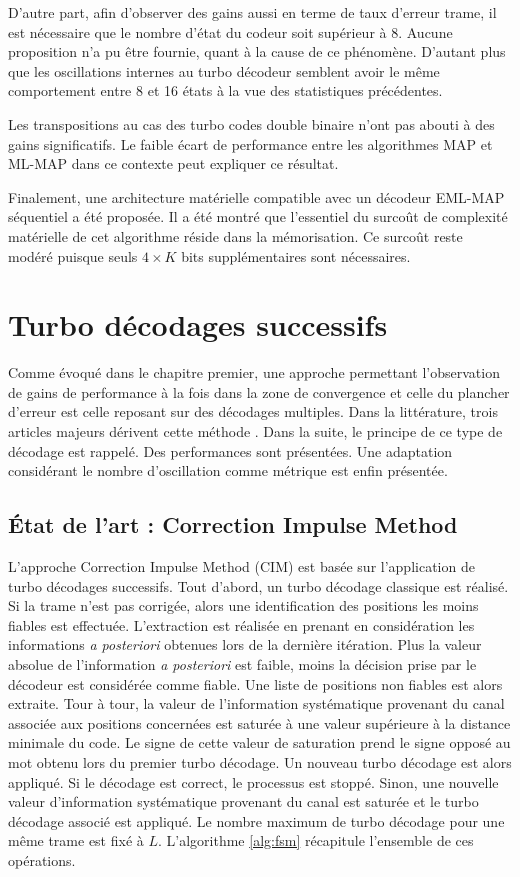  D'autre part, afin d'observer des gains aussi en terme de taux d'erreur trame, il est nécessaire que le 
 nombre d'état du codeur soit supérieur à 8. Aucune proposition n'a pu être fournie, quant à la cause de ce phénomène. 
 D'autant plus que les oscillations internes au 
turbo décodeur semblent avoir le même comportement entre 8 et 16 états à la vue des statistiques précédentes. 

Les transpositions au cas des turbo codes double binaire n'ont pas abouti à des gains significatifs. Le faible écart de 
performance entre les algorithmes MAP et ML-MAP dans ce contexte peut expliquer ce résultat.

Finalement, une architecture matérielle compatible avec un décodeur EML-MAP séquentiel a été proposée. Il a été montré 
que l'essentiel du surcoût de complexité matérielle de cet algorithme réside dans la mémorisation. Ce surcoût reste modéré puisque 
seuls $4\times K$ bits supplémentaires sont nécessaires.

\section{Turbo décodages successifs}
Comme évoqué dans le chapitre premier, une approche permettant l'observation de gains de performance à la fois dans la 
zone de convergence et celle du plancher d'erreur est celle reposant sur des décodages multiples. Dans la littérature, trois 
articles majeurs dérivent cette méthode \cite{cim,fsm,pflet}. Dans la suite, le principe de ce type de décodage est rappelé. 
Des performances sont présentées. Une adaptation considérant le nombre d'oscillation comme métrique est enfin présentée.

\subsection{État de l'art : Correction Impulse Method}
L'approche Correction Impulse Method (CIM) est basée sur l'application de turbo décodages successifs. Tout d'abord, un turbo décodage 
classique est réalisé. Si la trame n'est pas corrigée, alors une identification des positions les moins fiables est effectuée. 
L'extraction est réalisée en prenant en considération les informations \textit{a posteriori} obtenues lors de la dernière 
itération. Plus la valeur absolue de l'information \textit{a posteriori} est faible, moins la décision prise par le 
décodeur est considérée comme fiable. Une liste de positions non fiables est alors extraite. Tour à tour, la valeur de l'information systématique provenant du canal 
associée aux positions concernées est saturée à une valeur supérieure à la distance minimale du code. Le signe de cette 
valeur de saturation prend le signe opposé au mot obtenu lors du premier turbo décodage. Un nouveau turbo décodage est alors
appliqué. Si le décodage est correct, le processus est stoppé. Sinon, une nouvelle valeur d'information systématique provenant du canal est saturée
et le turbo décodage associé est appliqué. Le nombre maximum de turbo décodage pour une même trame est fixé à 
$L$. L'algorithme \ref{alg:fsm} récapitule l'ensemble de ces opérations.

